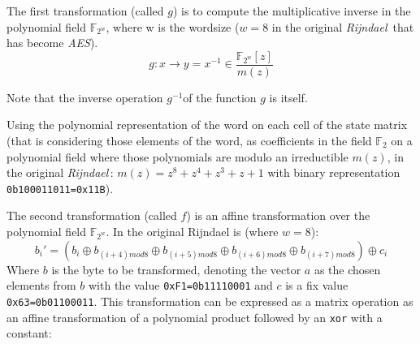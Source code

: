 \documentclass[10pt,a4paper,twoside]{llncs}
\newcommand{\rijndael}{\emph{Rijndael}}
\newcommand{\Fq}[1]{\ensuremath{\mathbb{F}_#1}}
\newcommand{\Fpn}[2]{\ensuremath{\mathbb{F}_{#1^#2}}}
\newcommand{\Fpnm}[2]{\ensuremath{\frac{\Fpn{2}{#1}[#2]}{m(#2)}}}
\begin{document}
The first transformation (called $g$) is to compute the multiplicative inverse in the polynomial field \Fpn{2}{w}, where w is the wordsize ($w=8$ in the original \rijndael\, that has become \emph{AES}).
\begin{equation}\label{eq:multInvPolyField}
 g:x\rightarrow y = x^{-1} \in \Fpnm{w}{z} 
\end{equation}

Note that the inverse operation $g^{-1}$of the function $g$ is itself.

Using the polynomial representation of the word on each cell of the state matrix (that is considering those elements of the word, as coefficients in the field \Fq{2} on a polynomial field where those polynomials are modulo an irreductible $m(z)$, in the original \rijndael\,: $m(z)=z^8+z^4+z^3+z+1$ with binary representation \texttt{0b100011011=0x11B}).

The second transformation (called $f$) is an affine transformation over the polynomial field \Fpn{2}{w}. In the original Rijndael is (where $w=8$):
\begin{equation}\label{eq:subBytes:affine}
 b_{i}' = (b_{i} \oplus b_{(i+4)mod8} \oplus b_{(i+5)mod8} \oplus 
          b_{(i+6)mod8} \oplus b_{(i+7)mod8}) \oplus c_{i}
\end{equation}
Where $b$ is the byte to be transformed, denoting the vector $a$ as the chosen elements from $b$ with the value \texttt{0xF1=0b11110001} and $c$ is a fix value \texttt{0x63=0b01100011}. This transformation can be expressed as a matrix operation as an affine transformation of a polynomial product followed by an {\tt xor} with a constant:
\end{document}
